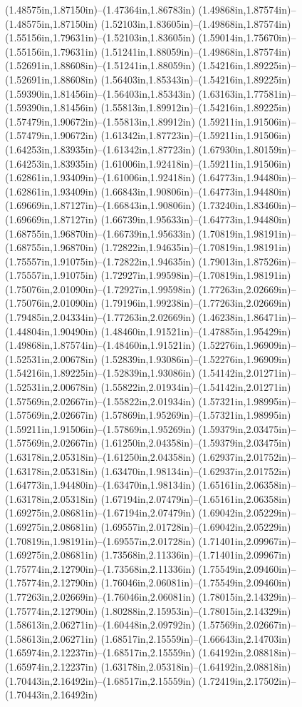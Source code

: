 (1.48575in,1.87150in)--(1.47364in,1.86783in) (1.49868in,1.87574in)--(1.48575in,1.87150in) (1.52103in,1.83605in)--(1.49868in,1.87574in) (1.55156in,1.79631in)--(1.52103in,1.83605in) (1.59014in,1.75670in)--(1.55156in,1.79631in) (1.51241in,1.88059in)--(1.49868in,1.87574in) (1.52691in,1.88608in)--(1.51241in,1.88059in) (1.54216in,1.89225in)--(1.52691in,1.88608in) (1.56403in,1.85343in)--(1.54216in,1.89225in) (1.59390in,1.81456in)--(1.56403in,1.85343in) (1.63163in,1.77581in)--(1.59390in,1.81456in) (1.55813in,1.89912in)--(1.54216in,1.89225in) (1.57479in,1.90672in)--(1.55813in,1.89912in) (1.59211in,1.91506in)--(1.57479in,1.90672in) (1.61342in,1.87723in)--(1.59211in,1.91506in) (1.64253in,1.83935in)--(1.61342in,1.87723in) (1.67930in,1.80159in)--(1.64253in,1.83935in) (1.61006in,1.92418in)--(1.59211in,1.91506in) (1.62861in,1.93409in)--(1.61006in,1.92418in) (1.64773in,1.94480in)--(1.62861in,1.93409in) (1.66843in,1.90806in)--(1.64773in,1.94480in) (1.69669in,1.87127in)--(1.66843in,1.90806in) (1.73240in,1.83460in)--(1.69669in,1.87127in) (1.66739in,1.95633in)--(1.64773in,1.94480in) (1.68755in,1.96870in)--(1.66739in,1.95633in) (1.70819in,1.98191in)--(1.68755in,1.96870in) (1.72822in,1.94635in)--(1.70819in,1.98191in) (1.75557in,1.91075in)--(1.72822in,1.94635in) (1.79013in,1.87526in)--(1.75557in,1.91075in) (1.72927in,1.99598in)--(1.70819in,1.98191in) (1.75076in,2.01090in)--(1.72927in,1.99598in) (1.77263in,2.02669in)--(1.75076in,2.01090in) (1.79196in,1.99238in)--(1.77263in,2.02669in) (1.79485in,2.04334in)--(1.77263in,2.02669in) (1.46238in,1.86471in)--(1.44804in,1.90490in) (1.48460in,1.91521in)--(1.47885in,1.95429in) (1.49868in,1.87574in)--(1.48460in,1.91521in) (1.52276in,1.96909in)--(1.52531in,2.00678in) (1.52839in,1.93086in)--(1.52276in,1.96909in) (1.54216in,1.89225in)--(1.52839in,1.93086in) (1.54142in,2.01271in)--(1.52531in,2.00678in) (1.55822in,2.01934in)--(1.54142in,2.01271in) (1.57569in,2.02667in)--(1.55822in,2.01934in) (1.57321in,1.98995in)--(1.57569in,2.02667in) (1.57869in,1.95269in)--(1.57321in,1.98995in) (1.59211in,1.91506in)--(1.57869in,1.95269in) (1.59379in,2.03475in)--(1.57569in,2.02667in) (1.61250in,2.04358in)--(1.59379in,2.03475in) (1.63178in,2.05318in)--(1.61250in,2.04358in) (1.62937in,2.01752in)--(1.63178in,2.05318in) (1.63470in,1.98134in)--(1.62937in,2.01752in) (1.64773in,1.94480in)--(1.63470in,1.98134in) (1.65161in,2.06358in)--(1.63178in,2.05318in) (1.67194in,2.07479in)--(1.65161in,2.06358in) (1.69275in,2.08681in)--(1.67194in,2.07479in) (1.69042in,2.05229in)--(1.69275in,2.08681in) (1.69557in,2.01728in)--(1.69042in,2.05229in) (1.70819in,1.98191in)--(1.69557in,2.01728in) (1.71401in,2.09967in)--(1.69275in,2.08681in) (1.73568in,2.11336in)--(1.71401in,2.09967in) (1.75774in,2.12790in)--(1.73568in,2.11336in) (1.75549in,2.09460in)--(1.75774in,2.12790in) (1.76046in,2.06081in)--(1.75549in,2.09460in) (1.77263in,2.02669in)--(1.76046in,2.06081in) (1.78015in,2.14329in)--(1.75774in,2.12790in) (1.80288in,2.15953in)--(1.78015in,2.14329in) (1.58613in,2.06271in)--(1.60448in,2.09792in) (1.57569in,2.02667in)--(1.58613in,2.06271in) (1.68517in,2.15559in)--(1.66643in,2.14703in) (1.65974in,2.12237in)--(1.68517in,2.15559in) (1.64192in,2.08818in)--(1.65974in,2.12237in) (1.63178in,2.05318in)--(1.64192in,2.08818in) (1.70443in,2.16492in)--(1.68517in,2.15559in) (1.72419in,2.17502in)--(1.70443in,2.16492in) 